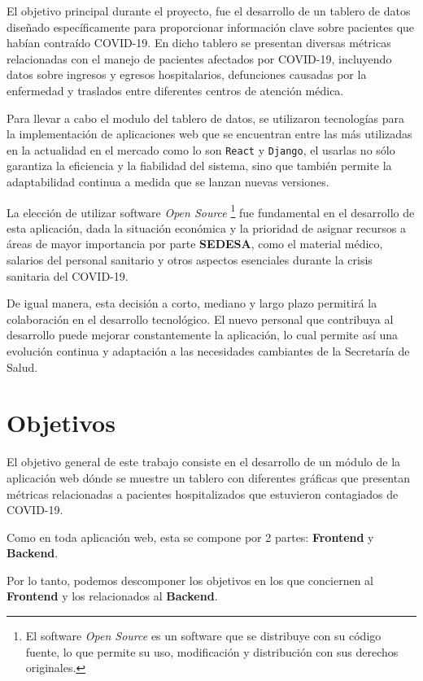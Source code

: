 El objetivo principal durante el proyecto, fue el desarrollo de un tablero de datos diseñado específicamente para proporcionar información clave sobre pacientes que habían contraído \textsc{COVID-19}.
En dicho tablero se presentan diversas métricas relacionadas con el manejo de pacientes afectados por \textsc{COVID-19}, incluyendo datos sobre ingresos y egresos hospitalarios, defunciones causadas por la enfermedad y traslados entre diferentes centros de atención médica.

Para llevar a cabo el modulo del tablero de datos, se utilizaron tecnologías para la implementación de aplicaciones web que se encuentran entre las más utilizadas en la actualidad en el mercado como lo son \texttt{React} y \texttt{Django}, el usarlas no sólo garantiza la eficiencia y la fiabilidad del sistema, sino que también permite la adaptabilidad continua a medida que se lanzan nuevas versiones.

La elección de utilizar software \textit{Open Source} \footnote{El software \textit{Open Source} es un software que se distribuye con su código fuente, lo que permite su uso, modificación y distribución con sus derechos originales.} fue fundamental en el desarrollo de esta aplicación, dada la situación económica y la prioridad de asignar recursos a áreas de mayor importancia por parte \textbf{SEDESA}, como el material médico, salarios del personal sanitario y otros aspectos esenciales durante la crisis sanitaria del \textsc{COVID-19}.

De igual manera, esta decisión a corto, mediano y largo plazo permitirá la colaboración en el desarrollo tecnológico. El nuevo personal que contribuya al desarrollo puede mejorar constantemente la aplicación, lo cual permite así una evolución continua y adaptación a las necesidades cambiantes de la Secretaría de Salud.

\section{Objetivos}\label{intro_obj}
El objetivo general de este trabajo consiste en el desarrollo de un módulo de la aplicación web dónde se muestre un tablero con diferentes gráficas que presentan métricas relacionadas a pacientes hospitalizados que estuvieron contagiados de \textsc{COVID-19}.

Como en toda aplicación web, esta se compone por 2 partes: \textbf{Frontend} y \textbf{Backend}.

Por lo tanto, podemos descomponer los objetivos en los que conciernen al \textbf{Frontend} y los relacionados al \textbf{Backend}.


